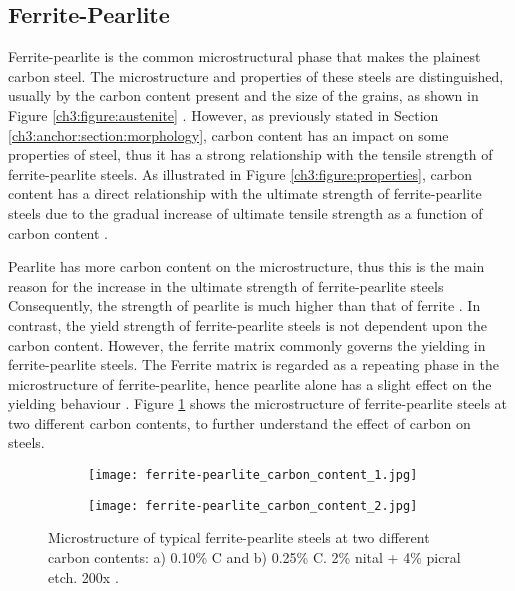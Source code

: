 \subsection{Ferrite-Pearlite}
Ferrite-pearlite is the common microstructural phase that makes the plainest carbon steel. The microstructure and properties of these steels are distinguished, usually by the carbon content present and the size of the grains, as shown in Figure \ref{ch3:figure:austenite} \cite{molabe2018determining}. However, as previously stated in Section \ref{ch3:anchor:section:morphology}, carbon content has an impact on some properties of steel, thus it has a strong relationship with the tensile strength of ferrite-pearlite steels. As illustrated in Figure \ref{ch3:figure:properties}, carbon content has a direct relationship with the ultimate strength of ferrite-pearlite steels due to the gradual increase of ultimate tensile strength as a function of carbon content \cite{zhao2013effects}.

Pearlite has more carbon content on the microstructure, thus this is the main reason for the increase in the ultimate strength of ferrite-pearlite steels \cite{bajaj2020steels} Consequently, the strength of pearlite is much higher than that of ferrite \cite{molabe2018determining}. In contrast, the yield strength of ferrite-pearlite steels is not dependent upon the carbon content. However, the ferrite matrix commonly governs the yielding in ferrite-pearlite steels. The Ferrite matrix is regarded as a repeating phase in the microstructure of ferrite-pearlite, hence pearlite alone has a slight effect on the yielding behaviour \cite{molabe2018determining}. Figure \ref{ch3:figure:contents} shows the microstructure of ferrite-pearlite steels at two different carbon contents, to further understand the effect of carbon on steels.

\begin{figure}[H]

\centering
\begin{subfigure}{.45\textwidth}
    \centering
    \texttt{[image: ferrite-pearlite\_carbon\_content\_1.jpg]}
    \caption{}
\end{subfigure}
\begin{subfigure}{.45\textwidth}
    \centering
    \texttt{[image: ferrite-pearlite\_carbon\_content\_2.jpg]}
    \caption{}
\end{subfigure}

\caption{Microstructure of typical ferrite-pearlite steels at two different carbon contents: a) 0.10\% C and b) 0.25\% C. 2\% nital + 4\% picral etch. 200x \cite{osei2015foam}.}
\label{ch3:figure:contents}
\end{figure}
 
